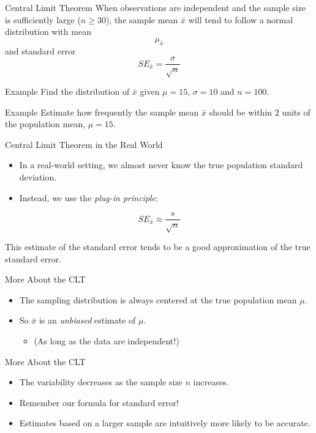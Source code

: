 \begin{frame}{Central Limit Theorem}
    When observations are independent and the sample size is sufficiently large ($n \ge 30$), the sample mean $\bar{x}$ will tend to follow a normal distribution with mean
    \[
        \mu_{\bar{x}}
    \]
    and standard error
    \[
        SE_{\bar{x}} = \frac{\sigma}{\sqrt{n}}
    \]
\end{frame}

\begin{frame}{Example}
    Find the distribution of $\bar{x}$ given $\mu = 15$, $\sigma = 10$ and $n = 100$.
\end{frame}

\begin{frame}{Example}
    Estimate how frequently the sample mean $\bar{x}$ should be within $2$ units of the population mean, $\mu = 15$.
\end{frame}

\begin{frame}{Central Limit Theorem in the Real World}
    \begin{itemize}
        \item In a real-world setting, we almost never know the true population standard deviation. 
        \item Instead, we use the \textit{plug-in principle}:
    \end{itemize}
    
    \[
        SE_{\bar{x}} \approx \frac{s}{\sqrt{n}}
    \]
    
    \vspace{12pt}This estimate of the standard error tends to be a good approximation of the true standard error.
\end{frame}

\begin{frame}{More About the CLT}
    \begin{itemize}
        \item The sampling distribution is always centered at the true population mean $\mu$.
        \item So $\bar{x}$ is an \textit{unbiased} estimate of $\mu$.
        \begin{itemize}
            \item (As long as the data are independent!)
        \end{itemize}
    \end{itemize} 
\end{frame}

\begin{frame}{More About the CLT}
    \begin{itemize}
        \item The variability decreases as the sample size $n$ increases.
        \item Remember our formula for standard error!
        \item Estimates based on a larger sample are intuitively more likely to be accurate.
    \end{itemize}
\end{frame}
